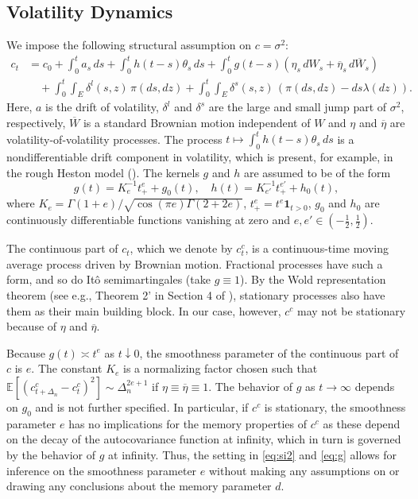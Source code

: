 \documentclass[ecta,nameyear,draft]{econsocart}
\newcommand{\1}{\mathbf 1}
\def\E{\mathbb{E}}
\newcommand{\jump}{\delta}
\numberwithin{equation}{section}
\newcommand{\bone}{\mathbf 1}
\newcommand{\la}{{\lambda}}
\newcommand{\Ga}{{\Gamma}}
\newcommand{\si}{{\sigma}}
\newcommand{\ov}{\overline}
\newcommand{\Den}{\Delta_n}
\begin{document}
 
\subsection{Volatility Dynamics}

We impose the following structural assumption on $c=\si^2$:
\begin{equation} 
	\label{eq:si2} 
	\begin{split}
			c_t &=  c_0+\int_0^t a_s \, ds+\int_0^t  h(t-s) \theta_s \, ds + \int_0^t g(t-s) (\eta_s \,dW_s +   \ov\eta_s \,d\ov W_s)
			\\
		&\quad + \int_0^t \int_E \jump^{l}(s,z)\,\pi(ds, dz)+ \int_0^t \int_E \jump^{s}(s,z) \, (\pi(ds, dz)-ds\la(dz)).
	\end{split}
\end{equation}
Here, $a$ is the drift of volatility, $\jump^l$ and $\jump^s$ are the large and small jump part of $\si^2$, respectively, $\ov W$ is a standard Brownian motion independent of $W$ and $\eta$ and $\ov\eta$ are volatility-of-volatility processes. The process $t\mapsto\int_0^t   h(t-s) \theta_s \, ds$ is a nondifferentiable drift component in volatility, which is present, for example, in the rough Heston model (\cite{ER19}). The kernels $g$ and $h$ are assumed to be of the form
\begin{equation}\label{eq:g} 
	g(t) = K_e^{-1}t^e_+ + g_0(t),\quad h(t) = 	K_{e'}^{-1}t^{e'}_+ + h_0(t),
\end{equation}
where $K_e = \Ga(1+e)/\sqrt{\cos(\pi e)\Ga(2+2e)}$, $t^e_+ = t^e\bone_{t>0}$, $g_0$ and $h_0$ are  continuously differentiable functions vanishing at zero and $e,  e'\in(-\frac12,\frac12)$. 

The continuous part of $c_t$, which we denote by $c_t^{c}$, is a continuous-time moving average process driven by Brownian motion. Fractional processes   have such a form, and so do It\^o semimartingales (take $g\equiv 1$). By the Wold representation theorem (see e.g., Theorem 2' in Section 4 of \cite{H70}), stationary processes also have them as their main building block. In our case, however, $c^c$ may not be stationary because of $\eta$ and $\ov \eta$.

Because $g(t) \asymp t^e$ as $t\downarrow 0$, the smoothness parameter of the continuous part of $c$ is $e$. The constant $K_e$ is a normalizing factor chosen such that $\E[(c_{t+\Delta_n}^{c}-c_t^{c})^2] \sim \Den^{2e+1}$ if $\eta\equiv \ov\eta\equiv1$. The behavior of $g$ as $t\to\infty$ depends on $g_0$ and is not further specified. In particular, if $c^{c}$ is stationary, the smoothness parameter $e$ has no implications for the memory properties of $c^{c}$ as these depend on the decay of the autocovariance function at infinity, which in turn is governed by the behavior of $g$ at infinity. Thus, the setting in \eqref{eq:si2} and \eqref{eq:g} allows for inference on the smoothness parameter $e$ without making any assumptions on or drawing any conclusions about the memory parameter $d$.
\end{document}
